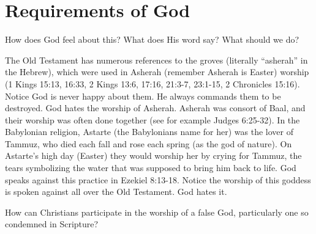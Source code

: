 \section{Requirements of God}
How does God feel about this?  What does His word say?  What should we do?

The Old Testament has numerous references to the groves (literally ``asherah'' in the Hebrew), which were used in Asherah (remember Asherah is Easter) worship (1 Kings 15:13, 16:33, 2 Kings 13:6, 17:16, 21:3-7, 23:1-15, 2 Chronicles 15:16).  Notice God is never happy about them.  He always commands them to be destroyed.  God hates the worship of Asherah.  Asherah was consort of Baal, and their worship was often done together (see for example Judges 6:25-32).  In the Babylonian religion, Astarte (the Babylonians name for her) was the lover of Tammuz, who died each fall and rose each spring (as the god of nature).  On Astarte's high day (Easter) they would worship her by crying for Tammuz, the tears symbolizing the water that was supposed to bring him back to life.  God speaks against this practice in Ezekiel 8:13-18.  Notice the worship of this goddess is spoken against all over the Old Testament.  God hates it.

How can Christians participate in the worship of a false God, particularly one so condemned in Scripture?

